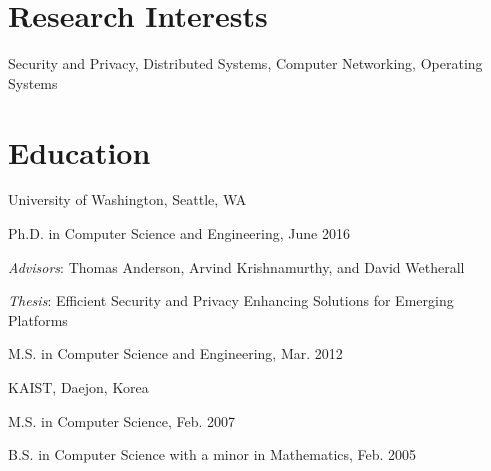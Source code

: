 \documentclass[line]{res}
\newenvironment{list1}{
  \begin{list}{\ding{113}}{%
      \setlength{\itemsep}{0in}
      \setlength{\parsep}{0in} \setlength{\parskip}{0in}
      \setlength{\topsep}{0in} \setlength{\partopsep}{0in}
      \setlength{\leftmargin}{0.17in}}}{\end{list}}
\begin{document}
\address{\small{haneul0318@gmail.com}, \small{550 E. Weddell Drive \#1210, Sunnyvale, 94089 CA}}

\begin{resume}

\section{Research Interests}
Security and Privacy, Distributed Systems, Computer Networking, Operating Systems


\section{Education}
University of Washington, Seattle, WA \\
\vspace*{-.1in}
\begin{list1}
\item[] Ph.D. in Computer Science and Engineering, June 2016
\item[] \textit{Advisors}: Thomas Anderson, Arvind Krishnamurthy, and David Wetherall
\item[] \textit{Thesis}: Efficient Security and Privacy Enhancing Solutions for Emerging Platforms
\item[] M.S. in Computer Science and Engineering, Mar. 2012
\end{list1}

KAIST, Daejon, Korea  \\
\vspace*{-.1in}
\begin{list1}
\item[] M.S. in Computer Science, Feb. 2007
\item[] B.S. in Computer Science with a minor in Mathematics, Feb. 2005
\end{list1}



\end{resume}
\end{document}
